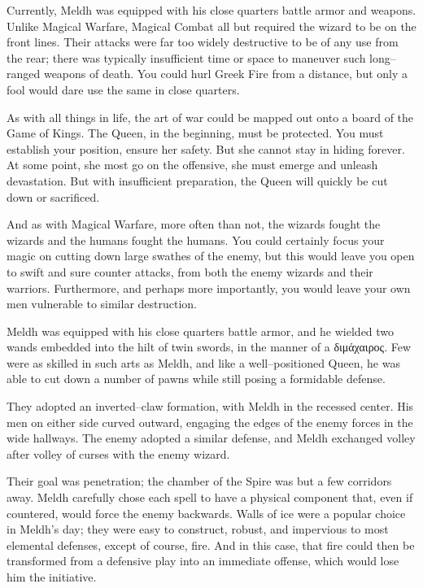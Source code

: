 Currently, Meldh was equipped with his close quarters battle armor and weapons. Unlike Magical Warfare, Magical Combat all but required the wizard to be on the front lines. Their attacks were far too widely destructive to be of any use from the rear; there was typically insufficient time or space to maneuver such long\mbox{--}ranged weapons of death. You could hurl Greek Fire from a distance, but only a fool would dare use the same in close quarters.

As with all things in life, the art of war could be mapped out onto a board of the Game of Kings. The Queen, in the beginning, must be protected. You must establish your position, ensure her safety. But she cannot stay in hiding forever. At some point, she most go on the offensive, she must emerge and unleash devastation. But with insufficient preparation, the Queen will quickly be cut down or sacrificed.

And as with Magical Warfare, more often than not, the wizards fought the wizards and the humans fought the humans. You could certainly focus your magic on cutting down large swathes of the enemy, but this would leave you open to swift and sure counter attacks, from both the enemy wizards and their warriors. Furthermore, and perhaps more importantly, you would leave your own men vulnerable to similar destruction.

Meldh was equipped with his close quarters battle armor, and he wielded two wands embedded into the hilt of twin swords, in the manner of a διμάχαιρος. Few were as skilled in such arts as Meldh, and like a well\mbox{--}positioned Queen, he was able to cut down a number of pawns while still posing a formidable defense.

They adopted an inverted\mbox{--}claw formation, with Meldh in the recessed center. His men on either side curved outward, engaging the edges of the enemy forces in the wide hallways. The enemy adopted a similar defense, and Meldh exchanged volley after volley of curses with the enemy wizard.

Their goal was penetration; the chamber of the Spire was but a few corridors away. Meldh carefully chose each spell to have a physical component that, even if countered, would force the enemy backwards. Walls of ice were a popular choice in Meldh’s day; they were easy to construct, robust, and impervious to most elemental defenses, except of course, fire. And in this case, that fire could then be transformed from a defensive play into an immediate offense, which would lose him the initiative.

